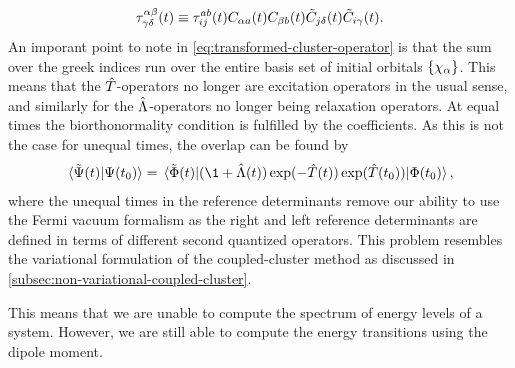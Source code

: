             \begin{align}
                \tau^{\alpha \beta}_{\gamma \delta}(t)
                \equiv
                \tau^{ab}_{ij}(t)
                C_{\alpha a}(t)
                C_{\beta b}(t)
                \tilde{C}_{j\delta}(t)
                \tilde{C}_{i\gamma}(t).
            \end{align}
            An imporant point to note in
            \autoref{eq:transformed-cluster-operator}
            is that the sum over the greek indices run over the entire basis set
            of initial orbitals $\left\{ \chi_{\alpha} \right\}$.
            This means that the $\hat{T}$-operators no longer are excitation
            operators in the usual sense, and similarly for the
            $\hat{\Lambda}$-operators no longer being relaxation operators.
            At equal times the biorthonormality condition is fulfilled by the
            coefficients.
            As this is not the case for unequal times, the overlap can be found
            by
            \begin{align}
                \braket*{\tilde{\Psi}(t)}{\Psi(t_0)}
                =
                \mel*{\tilde{\slat}(t)}{
                    (
                        \1 + \clustl(t)
                    )
                    \exponential(-\clust(t))
                    \exponential(\clust(t_0))
                }{\slat(t_0)},
            \end{align}
            where the unequal times in the reference determinants remove our
            ability to use the Fermi vacuum formalism as the right and left
            reference determinants are defined in terms of different second
            quantized operators.
            This problem resembles the variational formulation of the
            coupled-cluster method as discussed in
            \autoref{subsec:non-variational-coupled-cluster}.

            This means that we are unable to compute the spectrum of energy
            levels of a system.
            However, we are still able to compute the energy transitions using
            the dipole moment.


\clearemptydoublepage
